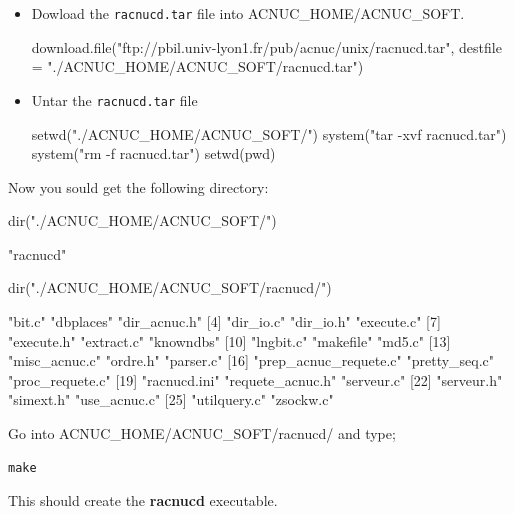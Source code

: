 \documentclass{article}
\begin{document}
\begin{itemize}
\item Dowload the \texttt{racnucd.tar} file into ACNUC\_HOME/ACNUC\_SOFT.

\begin{Schunk}
\begin{Sinput}
 download.file("ftp://pbil.univ-lyon1.fr/pub/acnuc/unix/racnucd.tar", 
     destfile = "./ACNUC_HOME/ACNUC_SOFT/racnucd.tar")
\end{Sinput}
\end{Schunk}

\item Untar the \texttt{racnucd.tar} file 

\begin{Schunk}
\begin{Sinput}
 setwd("./ACNUC_HOME/ACNUC_SOFT/")
 system("tar -xvf racnucd.tar")
 system("rm -f racnucd.tar")
 setwd(pwd)
\end{Sinput}
\end{Schunk}

\end{itemize}
Now you sould get the following directory:


\begin{Schunk}
\begin{Sinput}
 dir("./ACNUC_HOME/ACNUC_SOFT/")
\end{Sinput}
\begin{Soutput}
[1] "racnucd"
\end{Soutput}
\begin{Sinput}
 dir("./ACNUC_HOME/ACNUC_SOFT/racnucd/")
\end{Sinput}
\begin{Soutput}
 [1] "bit.c"                "dbplaces"             "dir_acnuc.h"         
 [4] "dir_io.c"             "dir_io.h"             "execute.c"           
 [7] "execute.h"            "extract.c"            "knowndbs"            
[10] "lngbit.c"             "makefile"             "md5.c"               
[13] "misc_acnuc.c"         "ordre.h"              "parser.c"            
[16] "prep_acnuc_requete.c" "pretty_seq.c"         "proc_requete.c"      
[19] "racnucd.ini"          "requete_acnuc.h"      "serveur.c"           
[22] "serveur.h"            "simext.h"             "use_acnuc.c"         
[25] "utilquery.c"          "zsockw.c"            
\end{Soutput}
\end{Schunk}

Go into ACNUC\_HOME/ACNUC\_SOFT/racnucd/ and type;
\begin{verbatim}
make
\end{verbatim}
This should create the \textbf{racnucd} executable.
\end{document}
